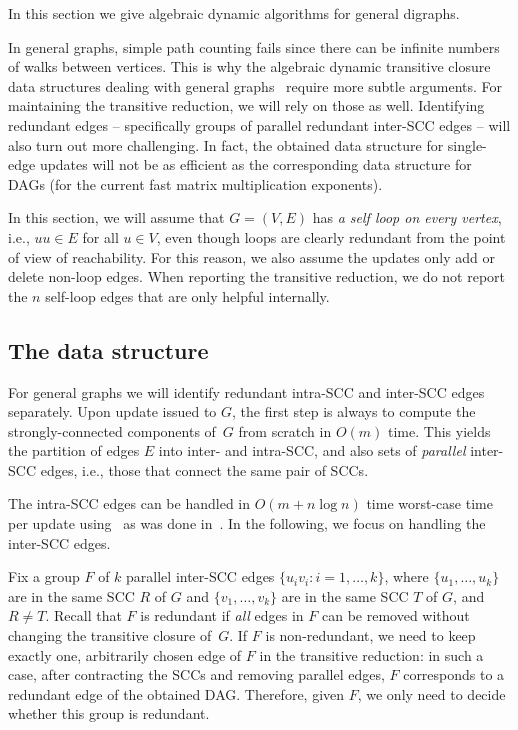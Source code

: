 \documentclass[11pt]{article}
\begin{document}
{In this section we give algebraic dynamic algorithms for general digraphs.


In general graphs, simple path counting fails since there can be infinite
numbers of walks between vertices. This is why the algebraic dynamic transitive closure
data structures dealing with general graphs~\cite{Sankowski04} require
more subtle arguments. For maintaining the transitive reduction, we will
rely on those as well. Identifying redundant edges -- specifically groups of parallel
redundant inter-SCC edges -- will also turn out more challenging.
In fact, the obtained data structure for single-edge updates will not be as efficient
as the corresponding data structure for DAGs (for the current fast matrix multiplication exponents).

In this section, we will assume that $G=(V,E)$ has \emph{a self loop on every vertex},
i.e., $uu\in E$ for all $u\in V$, even though loops are clearly
redundant from the point of view of reachability.
For this reason, we also assume the updates only add or delete non-loop edges.
When reporting the transitive reduction, we do not report the $n$ self-loop edges
that are only helpful internally.

\newcommand{\asymb}{\tilde{A}}

\subsection{The data structure}
For general graphs we will identify redundant intra-SCC and inter-SCC edges separately.
Upon update issued to $G$, the first step is always to compute the strongly-connected
components of~$G$ from scratch in $O(m)$ time.
This yields the partition of edges $E$ into inter- and intra-SCC, and also sets of \emph{parallel} inter-SCC edges, i.e., those that connect
the same pair of SCCs.

The intra-SCC edges can be handled in $O(m+n\log{n})$ time worst-case time per update using~ as was done in~.
In the following, we focus on handling the inter-SCC edges.

Fix a group $F$ of $k$ parallel inter-SCC edges $\{u_iv_i:i=1,\ldots,k\}$,
where
$\{u_1,\ldots,u_k\}$ are in the same SCC $R$ of $G$
and $\{v_1,\ldots,v_k\}$ are in the same SCC $T$ of $G$,
and $R\neq T$.
Recall that $F$ is redundant if \emph{all} edges in $F$ can be removed without changing the transitive closure of~$G$. If $F$ is non-redundant, we need to keep exactly one, arbitrarily chosen
edge of $F$ in the transitive reduction: in such a case, after contracting the SCCs and removing parallel edges, $F$ corresponds to a redundant edge of the obtained DAG.
Therefore, given $F$, we only need to decide whether this group is redundant. 

}
\end{document}
